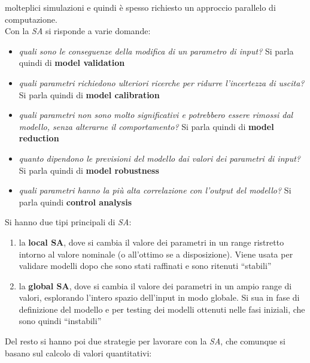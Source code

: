 \documentclass[a4paper,12pt, oneside]{book}
\begin{document}
molteplici simulazioni e quindi è spesso richiesto un approccio parallelo di
computazione. \\
Con la \textit{SA} si risponde a varie domande:
\begin{itemize}
  \item \textit{quali sono le conseguenze della modifica di un parametro di
    input?} Si parla quindi di \textbf{model validation}
  \item \textit{quali parametri richiedono ulteriori ricerche per ridurre
    l'incertezza di uscita?} Si parla quindi di \textbf{model calibration}
  \item \textit{quali parametri non sono molto significativi e potrebbero essere
    rimossi dal modello, senza alterarne il comportamento?} Si parla quindi di
  \textbf{model reduction}
  \item \textit{quanto dipendono le previsioni del modello dai valori dei
    parametri di input?} Si parla quindi di \textbf{model robustness}
  \item \textit{quali parametri hanno la più alta correlazione con l'output del
    modello?} Si parla quindi \textbf{control analysis}
\end{itemize}
Si hanno due tipi principali di \textit{SA}:
\begin{enumerate}
  \item la \textbf{local SA}, dove si cambia il valore dei parametri in un
  range ristretto intorno al valore nominale (o all'ottimo se a
  disposizione). Viene usata per validare modelli dopo che sono stati raffinati
  e sono ritenuti ``stabili'' 
  \item la \textbf{global SA}, dove si cambia il valore dei parametri in un
  ampio range di valori, esplorando l'intero spazio dell'input in modo
  globale. Si sua in fase di definizione del modello e per testing dei modelli
  ottenuti nelle fasi iniziali, che sono quindi ``instabili''
\end{enumerate}
Del resto si hanno poi due strategie per lavorare con la \textit{SA}, che
comunque si basano sul calcolo di valori quantitativi:
\end{document}
